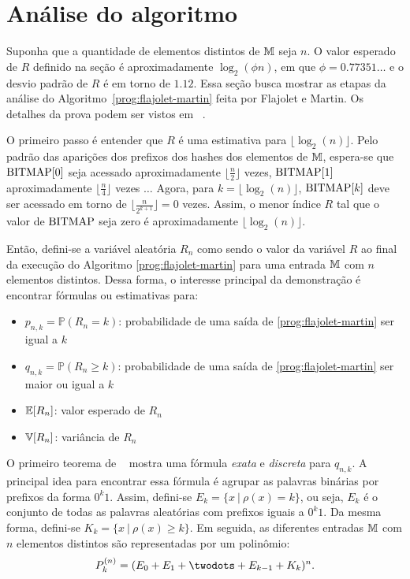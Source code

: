 \newpage
\section{Análise do algoritmo}
\label{sec:flajolet-martin:analysis}

Suponha que a quantidade de elementos distintos de $\mathbb{M}$ seja $n$. O valor esperado de $R$ definido na seção 
 é aproximadamente $\log_2(\phi n)$, em que $\phi = 0.77351\dots$ e o desvio padrão 
de $R$ é em torno de $1.12$. Essa seção busca mostrar as etapas da análise do Algoritmo~\ref{prog:flajolet-martin} feita 
por Flajolet e Martin. Os detalhes da prova podem ser vistos em ~\citep{flajolet:martin:85}.

O primeiro passo é entender que $R$ é uma estimativa para $\lfloor \log_2(n) \rfloor$. Pelo padrão das aparições dos 
prefixos dos hashes dos elementos de $\mathbb{M}$, espera-se que $\text{BITMAP}[0]$ seja acessado aproximadamente $\lfloor 
\frac{n}{2} \rfloor$ vezes, $\text{BITMAP}[1]$ aproximadamente $\lfloor \frac{n}{4} \rfloor$ vezes $\dots$ Agora, para 
$k = \lfloor \log_2(n) \rfloor$, $\text{BITMAP}[k]$ deve ser acessado em torno de $\lfloor \frac{n}{2^{k+1}} \rfloor = 0$ 
vezes. Assim, o menor índice $R$ tal que o valor de $\text{BITMAP}$ seja zero é aproximadamente $\lfloor \log_2(n) \rfloor$.

Então, defini-se a variável aleatória $R_n$ como sendo o valor da variável $R$ ao final da execução do Algoritmo 
\ref{prog:flajolet-martin} para uma entrada $\mathbb{M}$ com $n$ elementos distintos. Dessa forma, o interesse principal 
da demonstração é encontrar fórmulas ou estimativas para:
\begin{itemize}
  \item $p_{n,k} = \mathbb{P}(R_n = k)$: probabilidade de uma saída de \ref{prog:flajolet-martin} ser igual a $k$
  \item $q_{n,k} = \mathbb{P}(R_n \geq k)$: probabilidade de uma saída de \ref{prog:flajolet-martin} 
  ser maior ou igual a $k$
  \item $\mathbb{E}[R_n]$: valor esperado de $R_n$
  \item $\mathbb{V}[R_n]$: variância de $R_n$
\end{itemize}

O primeiro teorema de ~\citep{flajolet:martin:85} mostra uma fórmula \textit{exata} e \textit{discreta} para $q_{n,k}$. 
A principal idea para encontrar essa fórmula é agrupar as palavras binárias por prefixos da forma $0^k1$. Assim, 
defini-se $E_k = \{ x  \ | \ \rho(x) = k \}$, ou seja, $E_k$ é o conjunto de todas as palavras aleatórias com prefixos
iguais a $0^k1$. Da mesma forma, defini-se $K_k = \{ x \ | \ \rho(x) \geq k \}$. Em seguida, as diferentes entradas 
$\mathbb{M}$ com $n$ elementos distintos são representadas por um polinômio:
\[ P_k^{(n)} = (E_0 + E_1 + \twodots + E_{k-1} + K_k)^n .\]

